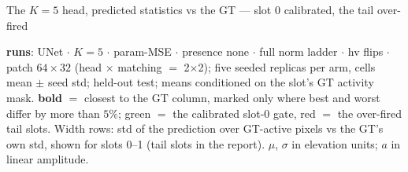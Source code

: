 \begin{frame}{The $K{=}5$ head, predicted statistics vs the GT --- slot 0 calibrated, the tail over-fired}
  \parbox{0.82\textwidth}{\tiny\color{soft} \textbf{runs}: UNet $\cdot$ $K{=}5$ $\cdot$ param-MSE $\cdot$ presence none $\cdot$ full norm ladder $\cdot$ hv flips $\cdot$ patch $64{\times}32$ (head $\times$ matching $=$ 2$\times$2); five seeded replicas per arm, cells mean $\pm$ seed std; held-out test; means conditioned on the slot's GT activity mask. \textbf{bold} $=$ closest to the \textcolor{good}{GT} column, marked only where best and worst differ by more than $5\%$; \textcolor{good}{green} $=$ the calibrated slot-0 gate, \textcolor{accent}{red} $=$ the over-fired tail slots. Width rows: std of the prediction over GT-active pixels vs the GT's own std, shown for slots 0--1 (tail slots in the report). $\mu$, $\sigma$ in elevation units; $a$ in linear amplitude.\par}
    

\end{frame}

